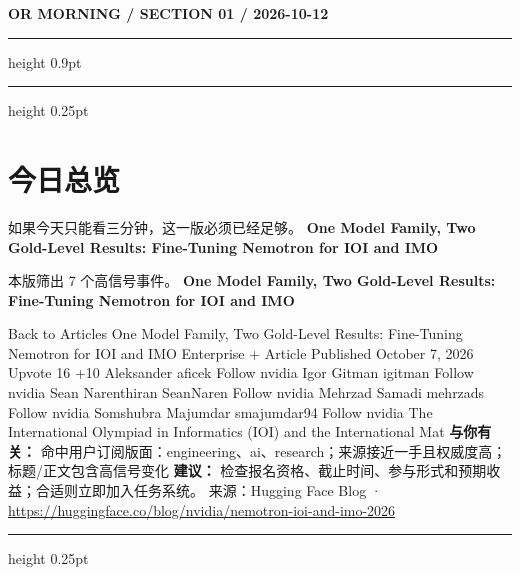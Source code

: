 \documentclass[10.5pt]{ctexart}
\begin{document}
{\small\bfseries OR MORNING / SECTION 01 / 2026-10-12}
\vspace{2mm}
\hrule height 0.9pt
\vspace{1.5mm}
\hrule height 0.25pt
\vspace{4mm}
\section*{今日总览}
{\color{ormuted} 如果今天只能看三分钟，这一版必须已经足够。}
\vspace{2mm}
{\fontsize{25}{29}\selectfont\bfseries One Model Family, Two Gold-Level Results: Fine-Tuning Nemotron for IOI and IMO}\par
\vspace{2mm}
{\large 本版筛出 7 个高信号事件。}
\vspace{3mm}
{\Large\bfseries One Model Family, Two Gold-Level Results: Fine-Tuning Nemotron for IOI and IMO}\par
Back to Articles One Model Family, Two Gold-Level Results: Fine-Tuning Nemotron for IOI and IMO Enterprise + Article Published October 7, 2026 Upvote 16 +10 Aleksander aficek Follow nvidia Igor Gitman igitman Follow nvidia Sean Narenthiran SeanNaren Follow nvidia Mehrzad Samadi mehrzads Follow nvidia Somshubra Majumdar smajumdar94 Follow nvidia The International Olympiad in Informatics (IOI) and the International Mat
\textbf{与你有关：} 命中用户订阅版面：engineering、ai、research；来源接近一手且权威度高；标题/正文包含高信号变化
\textbf{建议：} 检查报名资格、截止时间、参与形式和预期收益；合适则立即加入任务系统。
{\footnotesize\color{ormuted} 来源：Hugging Face Blog · \url{https://huggingface.co/blog/nvidia/nemotron-ioi-and-imo-2026}}
\vspace{3mm}
\hrule height 0.25pt
\vspace{3mm}
\end{document}
